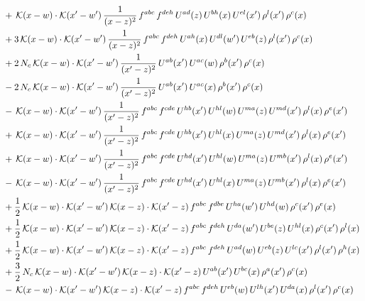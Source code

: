 \documentclass[10pt]{article}
\numberwithin{equation}{section}
\begin{document}
\begin{align}
&+\,\mathcal{K}(x-w)\cdot\mathcal{K}(x'-w')\,\frac{1}{(x-z)^{2}}\,f^{abc}\,f^{deh}\,U^{ad}(z)\,U^{bh}(x)\,U^{el}(x')\,\rho^{l}(x')\,\rho^{c}(x)\notag\\
&+3\,\mathcal{K}(x-w)\cdot\mathcal{K}(x'-w')\,\frac{1}{(x-z)^{2}}\,f^{abc}\,f^{deh}\,U^{ah}(x)\,U^{dl}(w')\,U^{eb}(z)\,\rho^{l}(x')\,\rho^{c}(x)\notag\\
&+2\,N_{c}\,\mathcal{K}(x-w)\cdot\mathcal{K}(x'-w')\,\frac{1}{(x'-z)^{2}}\,U^{ab}(x')\,U^{ac}(w)\,\rho^{b}(x')\,\rho^{c}(x)\notag\\
&-2\,N_{c}\,\mathcal{K}(x-w)\cdot\mathcal{K}(x'-w')\,\frac{1}{(x'-z)^{2}}\,U^{ab}(x')\,U^{ac}(x)\,\rho^{b}(x')\,\rho^{c}(x)\notag\\
&-\,\mathcal{K}(x-w)\cdot\mathcal{K}(x'-w')\,\frac{1}{(x'-z)^{2}}\,f^{abc}\,f^{cde}\,U^{hb}(x')\,U^{hl}(w)\,U^{ma}(z)\,U^{md}(x')\,\rho^{l}(x)\,\rho^{e}(x')\notag\\
&+\,\mathcal{K}(x-w)\cdot\mathcal{K}(x'-w')\,\frac{1}{(x'-z)^{2}}\,f^{abc}\,f^{cde}\,U^{hb}(x')\,U^{hl}(x)\,U^{ma}(z)\,U^{md}(x')\,\rho^{l}(x)\,\rho^{e}(x')\notag\\
&+\,\mathcal{K}(x-w)\cdot\mathcal{K}(x'-w')\,\frac{1}{(x'-z)^{2}}\,f^{abc}\,f^{cde}\,U^{hd}(x')\,U^{hl}(w)\,U^{ma}(z)\,U^{mb}(x')\,\rho^{l}(x)\,\rho^{e}(x')\notag\\
&-\,\mathcal{K}(x-w)\cdot\mathcal{K}(x'-w')\,\frac{1}{(x'-z)^{2}}\,f^{abc}\,f^{cde}\,U^{hd}(x')\,U^{hl}(x)\,U^{ma}(z)\,U^{mb}(x')\,\rho^{l}(x)\,\rho^{e}(x')\notag\\
&+\frac{1}{2}\,\mathcal{K}(x-w)\cdot\mathcal{K}(x'-w')\,\mathcal{K}(x-z)\cdot\mathcal{K}(x'-z)\,f^{abc}\,f^{dbe}\,U^{ha}(w')\,U^{hd}(w)\,\rho^{c}(x')\,\rho^{e}(x)\notag\\
&+\frac{1}{2}\,\mathcal{K}(x-w)\cdot\mathcal{K}(x'-w')\,\mathcal{K}(x-z)\cdot\mathcal{K}(x'-z)\,f^{abc}\,f^{deh}\,U^{da}(w')\,U^{be}(z)\,U^{hl}(x)\,\rho^{c}(x')\,\rho^{l}(x)\notag\\
&+\frac{1}{2}\,\mathcal{K}(x-w)\cdot\mathcal{K}(x'-w')\,\mathcal{K}(x-z)\cdot\mathcal{K}(x'-z)\,f^{abc}\,f^{deh}\,U^{ad}(w)\,U^{eb}(z)\,U^{lc}(x')\,\rho^{l}(x')\,\rho^{h}(x)\notag\\
&+\frac{3}{2}\,N_{c}\,\mathcal{K}(x-w)\cdot\mathcal{K}(x'-w')\,\mathcal{K}(x-z)\cdot\mathcal{K}(x'-z)\,U^{ab}(x')\,U^{bc}(x)\,\rho^{a}(x')\,\rho^{c}(x)\notag\\
&-\,\mathcal{K}(x-w)\cdot\mathcal{K}(x'-w')\,\mathcal{K}(x-z)\cdot\mathcal{K}(x'-z)\,f^{abc}\,f^{deh}\,U^{eb}(w)\,U^{lh}(x')\,U^{da}(x)\,\rho^{l}(x')\,\rho^{c}(x)\notag\\

\end{align}
\end{document}
